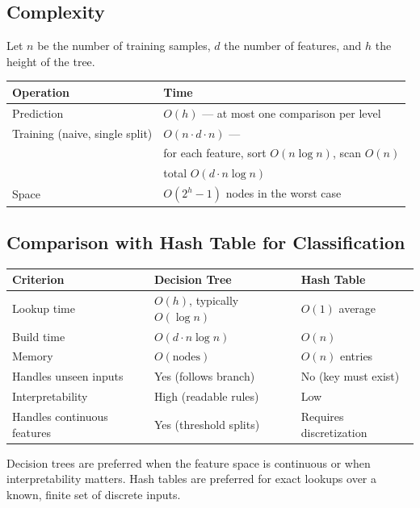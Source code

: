 \subsection{Complexity}

Let $n$ be the number of training samples, $d$ the number of features,
and $h$ the height of the tree.

\begin{center}
\begin{tabular}{ll}
\toprule
Operation & Time \\
\midrule
Prediction & $O(h)$ --- at most one comparison per level \\
Training (naive, single split) & $O(n \cdot d \cdot n)$ --- \\
  & for each feature, sort $O(n \log n)$, scan $O(n)$ \\
  & total $O(d \cdot n \log n)$ \\
Space & $O(2^h - 1)$ nodes in the worst case \\
\bottomrule
\end{tabular}
\end{center}

\subsection{Comparison with Hash Table for Classification}

\begin{center}
\begin{tabular}{lll}
\toprule
Criterion & Decision Tree & Hash Table \\
\midrule
Lookup time & $O(h)$, typically $O(\log n)$ & $O(1)$ average \\
Build time & $O(d \cdot n \log n)$ & $O(n)$ \\
Memory & $O(\text{nodes})$ & $O(n)$ entries \\
Handles unseen inputs & Yes (follows branch) & No (key must exist) \\
Interpretability & High (readable rules) & Low \\
Handles continuous features & Yes (threshold splits) & Requires discretization \\
\bottomrule
\end{tabular}
\end{center}

Decision trees are preferred when the feature space is continuous or
when interpretability matters.  Hash tables are preferred for exact
lookups over a known, finite set of discrete inputs.

